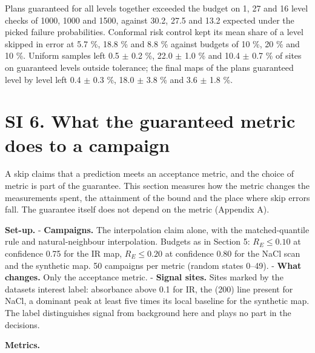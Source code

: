 \documentclass{iopjournal}
\begin{document}
Plans guaranteed for all levels together exceeded the budget on 1, 27 and 16 level checks of 1000, 1000 and 1500, against 30.2, 27.5 and 13.2 expected under the picked failure probabilities. Conformal risk control kept its mean share of a level skipped in error at 5.7 \%, 18.8 \% and 8.8 \% against budgets of 10 \%, 20 \% and 10 \%. Uniform samples left 0.5 \ensuremath{\pm} 0.2 \%, 22.0 \ensuremath{\pm} 1.0 \% and 10.4 \ensuremath{\pm} 0.7 \% of sites on guaranteed levels outside tolerance; the final maps of the plans guaranteed level by level left 0.4 \ensuremath{\pm} 0.3 \%, 18.0 \ensuremath{\pm} 3.8 \% and 3.6 \ensuremath{\pm} 1.8 \%.

\hypertarget{si-6.-what-the-guaranteed-metric-does-to-a-campaign}{%
\section*{SI 6. What the guaranteed metric does to a campaign}\label{si-6.-what-the-guaranteed-metric-does-to-a-campaign}}

A skip claims that a prediction meets an acceptance metric, and the choice of metric is part of the guarantee. This section measures how the metric changes the measurements spent, the attainment of the bound and the place where skip errors fall. The guarantee itself does not depend on the metric (Appendix A).

\textbf{Set-up.} - \textbf{Campaigns.} The interpolation claim alone, with the matched-quantile rule and natural-neighbour interpolation. Budgets as in Section 5: \(R_E \le 0.10\) at confidence 0.75 for the IR map, \(R_E \le 0.20\) at confidence 0.80 for the NaCl scan and the synthetic map. 50 campaigns per metric (random states 0--49). - \textbf{What changes.} Only the acceptance metric. - \textbf{Signal sites.} Sites marked by the dataset\textquotesingle s interest label: absorbance above 0.1 for IR, the (200) line present for NaCl, a dominant peak at least five times its local baseline for the synthetic map. The label distinguishes signal from background here and plays no part in the decisions.

\textbf{Metrics.}
\end{document}
